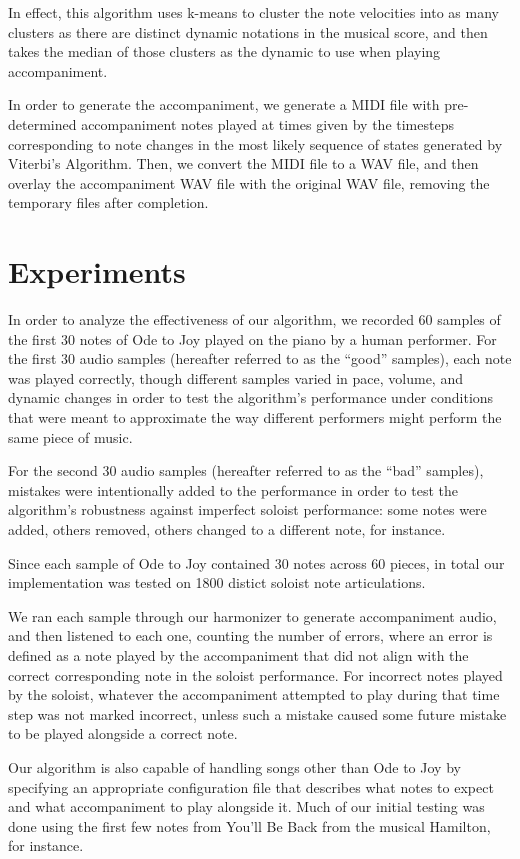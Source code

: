 \documentclass[11pt]{article}
\begin{document}
In effect, this algorithm uses k-means to cluster the note velocities into
as many clusters as there are distinct dynamic notations in the musical score,
and then takes the median of those clusters as the dynamic to use when
playing accompaniment.

In order to generate the accompaniment, we generate a MIDI file with
pre-determined accompaniment notes played at times given by the timesteps
corresponding to note changes in the most likely sequence of states generated
by Viterbi's Algorithm. Then, we convert the MIDI file to a WAV file,
and then overlay the accompaniment WAV file with the original WAV file,
removing the temporary files after completion.

\section{Experiments}

In order to analyze the effectiveness of our algorithm, we recorded 60
samples of the first 30 notes of Ode to Joy played on the piano by a human
performer. For the first 30 audio samples
(hereafter referred to as the ``good'' samples), each note was played correctly,
though different samples varied in pace, volume, and dynamic changes in order
to test the algorithm's performance under conditions that were meant to approximate
the way different performers might perform the same piece of music.

For the second 30 audio samples (hereafter referred to as the ``bad'' samples),
mistakes were intentionally added to the performance in order to test the algorithm's
robustness against imperfect soloist performance: some notes were added,
others removed, others changed to a different note, for instance.

Since each sample of Ode to Joy contained 30 notes across 60 pieces,
in total our implementation
was tested on 1800 distict soloist note articulations.

We ran each sample through our harmonizer to generate accompaniment audio,
and then listened to each one, counting the number of errors, where an error is
defined as a note played by the accompaniment that did not align with the correct
corresponding note in the soloist performance. For incorrect notes played by
the soloist, whatever the accompaniment attempted to play during that time step
was not marked incorrect, unless such a mistake caused some future mistake to be
played alongside a correct note.

Our algorithm is also capable of handling songs other than Ode to Joy by specifying
an appropriate configuration file that describes what notes to expect and what
accompaniment to play alongside it. Much of our initial testing was done using
the first few notes from You'll Be Back from the musical Hamilton, for instance.
\end{document}
